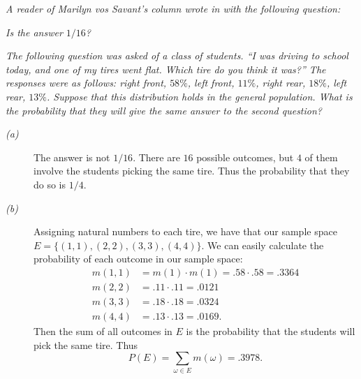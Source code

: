 \documentclass{tufte-handout}
\begin{document}
\begin{description}
\item \textit{A reader of Marilyn vos Savant's column wrote in with
    the following question: }
\item[(a)] \textit{Is the answer $1/16$?}
\item[(b)] \textit{The following question was asked of a class of
    students. ``I was driving to school today, and one of my tires
    went flat. Which tire do you think it was?'' The responses were as
    follows: right front, $58\%$, left front, $11\%$, right rear,
    $18\%$, left rear, $13\%$. Suppose that this distribution holds in
    the general population. What is the probability that they will
    give the same answer to the second question?}
\end{description}

\begin{description}
\item[\emph{(a)}] The answer is not $1/16$. There are $16$ possible
  outcomes, but $4$ of them involve the students picking the same
  tire. Thus the probability that they do so is $1/4$.
\item[\emph{(b)}] Assigning natural numbers to each tire, we have that
  our sample space $E = \{(1,1),(2,2),(3,3),(4,4)\}$. We can easily
  calculate the probability of each outcome in our sample space:
  \begin{align*}
    m(1,1) &= m(1) \cdot m(1) = .58 \cdot .58 = .3364\\
    m(2,2) &= .11 \cdot .11 = .0121\\
    m(3,3) &= .18 \cdot .18 = .0324\\
    m(4,4) &= .13 \cdot .13 = .0169.
  \end{align*}
  Then the sum of all outcomes in $E$ is the probability that the
  students will pick the same tire. Thus
  \[P(E) = \sum_{\omega \in E} m(\omega) = .3978.\]
\end{description}
\end{document}
